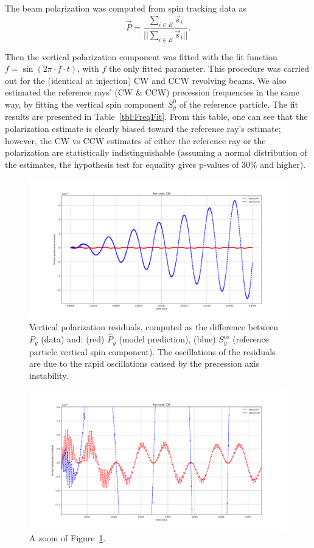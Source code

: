 \documentclass{article}
\begin{document}
The beam polarization was computed from spin tracking data as
\[
\vec P = \frac{\sum_{i\in E} \vec s_i}{||\sum_{i\in E} \vec s_i||}.
\]

Then the vertical polarization component was fitted with the fit function $f = \sin(2\pi\cdot f \cdot t)$, with $f$ the only fitted parameter. This procedure was carried out for the (identical at injection) CW and CCW revolving beams. We also estimated the reference rays' (CW \& CCW) precession frequencies in the same way, by fitting the vertical spin component $S_y^0$ of the reference particle. The fit results are presented in Table~\ref{tbl:FreqFit}. From this table, one can see that the polarization estimate is clearly biased toward the reference ray's estimate; however, the CW vs CCW estimates of either the reference ray or the polarization are statistically indistinguishable (assuming a normal distribution of the estimates, the hypothesis test for equality gives p-values of 30\% and higher). 

\begin{figure}[!h]
  \centering
  \includegraphics[width=\linewidth]{img/spin_axis_motion/CW_polarization_residual_full}
  \caption{Vertical polarization residuals, computed as the difference between $P_y$ (data) and: (red) $\hat P_y$ (model prediction), (blue) $S_y^{co}$ (reference particle vertical spin component). The oscillations of the residuals are due to the rapid oscillations caused by the precession axis instability.\label{fig:Py_fit_residual_full}}
\end{figure}
\begin{figure}[!h]
  \centering
  \includegraphics[width=\linewidth]{img/spin_axis_motion/CW_polarization_residual_cut}
  \caption{A zoom of Figure~\ref{fig:Py_fit_residual_full}.\label{fig:Py_fit_residual_cut}}
\end{figure}
\end{document}
